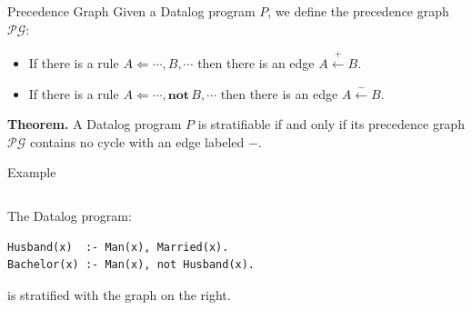 \begin{frame}{Precedence Graph}
Given a Datalog program $P$, we define the precedence graph $\mathcal{PG}$:

\begin{itemize}
    \item If there is a rule $A \Leftarrow \cdots, B, \cdots$ then there is an
    edge $A \stackrel{+}\leftarrow B$.
    \item If there is a rule $A \Leftarrow \cdots, \textbf{not} \, B, \cdots$
    then there is an edge $A \stackrel{-}\leftarrow B$.
\end{itemize}

\textbf{Theorem.} A Datalog program $P$ is stratifiable if and only if its
precedence graph $\mathcal{PG}$ contains no cycle with an edge labeled $-$.
\end{frame}

\begin{frame}[fragile]{Example}
\begin{columns}
\begin{column}{.55\textwidth}
The Datalog program:
\begin{lstlisting}[language=flix]
Husband(x)  :- Man(x), Married(x).
Bachelor(x) :- Man(x), not Husband(x).
\end{lstlisting}

is stratified with the graph on the right.
\end{column}  
\begin{column}{.45\textwidth}
\end{column}%
\end{columns}
\end{frame}
    
